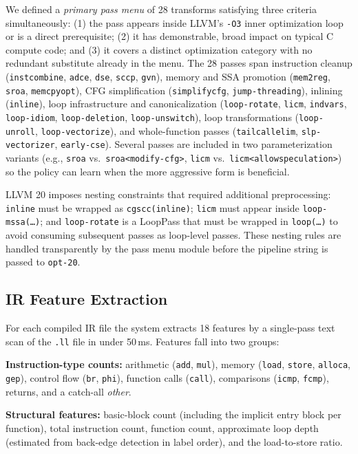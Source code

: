 \documentclass[conference]{IEEEtran}
\begin{document}
We defined a \emph{primary pass menu} of 28 transforms satisfying three
criteria simultaneously: (1) the pass appears inside LLVM's \texttt{-O3}
inner optimization loop or is a direct prerequisite; (2) it has demonstrable,
broad impact on typical C compute code; and (3) it covers a distinct
optimization category with no redundant substitute already in the menu.  The
28 passes span instruction cleanup (\texttt{instcombine}, \texttt{adce},
\texttt{dse}, \texttt{sccp}, \texttt{gvn}), memory and SSA promotion
(\texttt{mem2reg}, \texttt{sroa}, \texttt{memcpyopt}), CFG simplification
(\texttt{simplifycfg}, \texttt{jump-threading}), inlining (\texttt{inline}),
loop infrastructure and canonicalization (\texttt{loop-rotate}, \texttt{licm},
\texttt{indvars}, \texttt{loop-idiom}, \texttt{loop-deletion},
\texttt{loop-unswitch}), loop transformations (\texttt{loop-unroll},
\texttt{loop-vectorize}), and whole-function passes
(\texttt{tailcallelim}, \texttt{slp-vectorizer}, \texttt{early-cse}).
Several passes are included in two parameterization variants (e.g.,
\texttt{sroa} vs.\ \texttt{sroa<modify-cfg>},
\texttt{licm} vs.\ \texttt{licm<allowspeculation>}) so the policy can learn
when the more aggressive form is beneficial.

LLVM 20 imposes nesting constraints that required additional preprocessing:
\texttt{inline} must be wrapped as \texttt{cgscc(inline)};
\texttt{licm} must appear inside \texttt{loop-mssa(\ldots)}; and
\texttt{loop-rotate} is a LoopPass that must be wrapped in
\texttt{loop(\ldots)} to avoid consuming subsequent passes as loop-level
passes.  These nesting rules are handled transparently by the pass menu module
before the pipeline string is passed to \texttt{opt-20}.

\subsection{IR Feature Extraction}

For each compiled IR file the system extracts 18 features by a single-pass
text scan of the \texttt{.ll} file in under 50\,ms.  Features fall into two
groups:

\textbf{Instruction-type counts:} arithmetic (\texttt{add}, \texttt{mul}),
memory (\texttt{load}, \texttt{store}, \texttt{alloca}, \texttt{gep}), control
flow (\texttt{br}, \texttt{phi}), function calls (\texttt{call}), comparisons
(\texttt{icmp}, \texttt{fcmp}), returns, and a catch-all \emph{other}.

\textbf{Structural features:} basic-block count (including the implicit entry
block per function), total instruction count, function count, approximate loop
depth (estimated from back-edge detection in label order), and the
load-to-store ratio.
\end{document}
